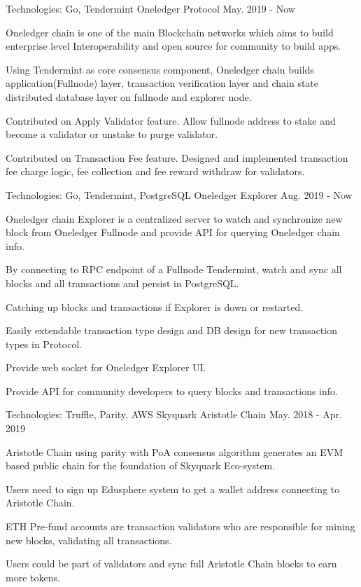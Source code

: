 \begin{cventries}
\cventry
    {Technologies: \quad Go, Tendermint
    }
    {Oneledger Protocol}
    {}
    {May. 2019 - Now}
    {
      \begin{cvitems}
        \item {Oneledger chain is one of the main Blockchain networks which aims to build enterprise level Interoperability and open source for community to build apps.}
        \item {Using Tendermint as core consensus component, Oneledger chain builds application(Fullnode) layer, transaction verification layer and chain state distributed database layer on fullnode and explorer node.}
        \item {Contributed on Apply Validator feature. Allow fullnode address to stake and become a validator or unstake to purge validator.}
        \item {Contributed on Transaction Fee feature. Designed and implemented transaction fee charge logic, fee collection and fee reward withdraw for validators.}
      \end{cvitems}
    }
    
    
    \cventry
    {Technologies: \quad Go, Tendermint, PostgreSQL
    }
    {Oneledger Explorer}
    {}
    {Aug. 2019 - Now}
    {
      \begin{cvitems}
        \item {Oneledger chain Explorer is a centralized server to watch and synchronize new block from Oneledger Fullnode and provide API for querying Oneledger chain info.}
        \item {By connecting to RPC endpoint of a Fullnode Tendermint, watch and sync all blocks and all transactions and persist in PostgreSQL.}
        \item {Catching up blocks and transactions if Explorer is down or restarted.}
        \item {Easily extendable transaction type design and DB design for new transaction types in Protocol.}
        \item {Provide web socket for Oneledger Explorer UI.}
        \item {Provide API for community developers to query blocks and transactions info.}
      \end{cvitems}
    }

\cventry
    {Technologies: \quad Truffle, Parity, AWS
    }
    {Skyquark Aristotle Chain}
    {}
    {May. 2018 - Apr. 2019}
    {
      \begin{cvitems}
        \item {Aristotle Chain using parity with PoA consensus algorithm generates an EVM based public chain for the foundation of Skyquark Eco-system.}
        \item {Users need to sign up Edusphere system to get a wallet address connecting to Aristotle Chain.}
        \item {ETH Pre-fund accounts are transaction validators who are responsible for mining new blocks, validating all transactions.}
        \item {Users could be part of validators and sync full Aristotle Chain blocks to earn more tokens.}
      \end{cvitems}
    }
    

\end{cventries}
